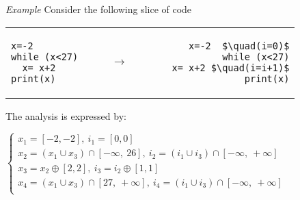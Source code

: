 \documentclass{llncs}
\begin{document}
\noindent\textit{Example}
Consider the following slice of code
\begin{center}
\begin{tabular}{lcr}
\begin{lstlisting}
x=-2
while (x<27)
  x= x+2
print(x)
\end{lstlisting} & $\qquad \rightarrow \qquad$ &
\begin{lstlisting}
x=-2  $\quad(i=0)$
while (x<27)
  x= x+2 $\quad(i=i+1)$
print(x)
\end{lstlisting} \\
\end{tabular}
\end{center}
The analysis is expressed by:
\begin{center}
$\begin{cases}
x_1 = [-2,-2],\ i_1 = [0,0]\\
x_2 = (x_1 \cup x_3) \cap [- \infty ,\ 26],\ i_2 = (i_1 \cup i_3) \cap [- \infty ,\ + \infty]\\
x_3 = x_2 \oplus [2,2],\ i_3 = i_2 \oplus [1,1] \\
x_4 = (x_1 \cup x_3) \cap [27 ,\ + \infty],\ i_4 = (i_1 \cup i_3) \cap [- \infty ,\ + \infty]\\
\end{cases}$
\end{center}
\end{document}
